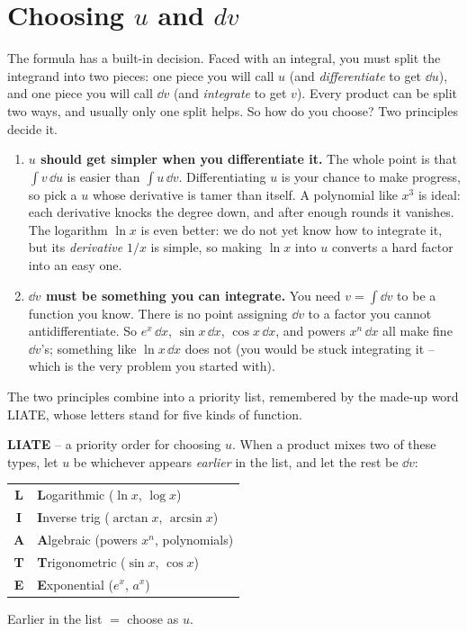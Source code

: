 \section{Choosing \texorpdfstring{$u$}{u} and \texorpdfstring{$dv$}{dv}}
\label{ch23:choosing}

The formula has a built-in decision. Faced with an integral, you must split the
integrand into two pieces: one piece you will call $u$ (and \emph{differentiate}
to get $\dd u$), and one piece you will call $\dd v$ (and \emph{integrate} to get
$v$). Every product can be split two ways, and usually only one split helps. So
how do you choose? Two principles decide it.

\begin{enumerate}
\item \textbf{$u$ should get simpler when you differentiate it.} The whole point
is that $\int v\,\dd u$ is easier than $\int u\,\dd v$. Differentiating $u$ is
your chance to make progress, so pick a $u$ whose derivative is tamer than
itself. A polynomial like $x^3$ is ideal: each derivative knocks the degree down,
and after enough rounds it vanishes. The logarithm $\ln x$ is even better: we
do not yet know how to integrate it, but its \emph{derivative} $1/x$ is
simple, so making $\ln x$ into $u$ converts a hard factor into an
easy one.

\item \textbf{$\dd v$ must be something you can integrate.} You need
$v=\int \dd v$ to be a function you know. There is no point assigning $\dd v$ to a
factor you cannot antidifferentiate. So $e^x\,\dd x$, $\sin x\,\dd x$,
$\cos x\,\dd x$, and powers $x^n\,\dd x$ all make fine $\dd v$'s; something like
$\ln x\,\dd x$ does not (you would be stuck integrating it -- which is the very
problem you started with).
\end{enumerate}

The two principles combine into a priority list, remembered by the made-up word
LIATE, whose letters stand for five kinds of function.

\begin{focusbox}
\textbf{LIATE} -- a priority order for choosing $u$. When a product mixes two of
these types, let $u$ be whichever appears \emph{earlier} in the list, and let the
rest be $\dd v$:
\begin{center}
\begin{tabular}{cl}
\textbf{L} & \textbf{L}ogarithmic ($\ln x$, $\log x$) \\
\textbf{I} & \textbf{I}nverse trig ($\arctan x$, $\arcsin x$) \\
\textbf{A} & \textbf{A}lgebraic (powers $x^n$, polynomials) \\
\textbf{T} & \textbf{T}rigonometric ($\sin x$, $\cos x$) \\
\textbf{E} & \textbf{E}xponential ($e^x$, $a^x$) \\
\end{tabular}
\end{center}
Earlier in the list $=$ choose as $u$.
\end{focusbox}

